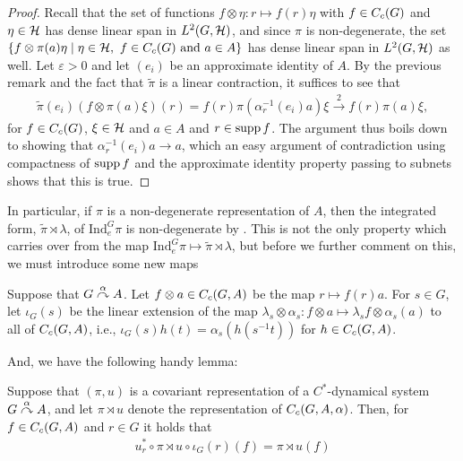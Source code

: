 \begin{proof}
Recall that the set of functions $f \otimes \eta \colon r \mapsto f(r) \eta$ with $f \in C_c(G)$ and $\eta \in \mathcal{H}$ has dense linear span in $L^2(G,\mathcal{H})$, and since $\pi$ is non-degenerate, the set $\{ f \otimes \pi(a) \eta \mid \eta \in \mathcal{H}, \ f \in C_c(G) \text{ and } a \in A \}$ has dense linear span in $L^2(G, \mathcal{H})$ as well. Let $\varepsilon > 0$ and let $(e_i)$ be an approximate identity of $A$. By the previous remark and the fact that $\tilde{\pi}$ is a linear contraction, it suffices to see that 
\begin{align*}
	\tilde{\pi}(e_i) (f \otimes \pi(a) \xi)(r)=f(r) \pi(\alpha_{r}^{-1}(e_i)a) \xi   \stackrel 2 \to f(r) \pi(a) \xi,
\end{align*}
for $f \in C_c(G)$, $\xi \in \mathcal{H}$ and $a \in A$ and $r \in \operatorname{supp} f$. The argument thus boils down to showing that $\alpha_r^{-1}(e_i) a \to a$, which an easy argument of contradiction using compactness of $\operatorname{supp} f$ and the approximate identity property passing to subnets shows that this is true.
\end{proof}
\begin{remark}
In particular, if $\pi$ is a non-degenerate representation of $A$, then the integrated form, $\tilde{\pi} \rtimes \lambda$, of $\mathrm{Ind}_e^G \pi$ is non-degenerate by . This is not the only property which carries over from the map $\mathrm{Ind}_e^G \pi \mapsto \tilde{\pi} \rtimes \lambda$, but before we further comment on this, we must introduce some new maps
\end{remark}
\begin{definition}
Suppose that $G \stackrel{\alpha}{\curvearrowright} A$. Let $f \otimes a  \in C_c(G,A)$ be the map $r \mapsto f(r)a$. For $s \in G$, let $\iota_G(s)$ be the linear extension of the map $\lambda_s \otimes \alpha_s \colon f \otimes a \mapsto \lambda_s f \otimes \alpha_s(a)$ to all of $C_c(G,A)$, i.e., $\iota_G(s) h(t) = \alpha_s(h(s^{-1}t))$ for $h \in C_c(G,A)$.
\end{definition}
And, we have the following handy lemma:
\begin{lemma}
Suppose that $(\pi,u)$ is a covariant representation of a $C^*$-dynamical system $G \stackrel{\alpha}{\curvearrowright} A$, and let $\pi \rtimes u$ denote the representation of $C_c(G,A,\alpha)$. Then, for $f \in C_c(G,A)$ and $r \in G$ it holds that
\begin{align*}
	 u_r^*  \circ \pi \rtimes u \circ \iota_G(r) (f) =   \pi \rtimes u (f)
\end{align*}
\label{cross:iotaG}
\end{lemma}
